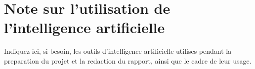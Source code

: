 \chapter*{Note sur l'utilisation de l'intelligence artificielle}

Indiquez ici, si besoin, les outils d'intelligence artificielle utilises pendant
la preparation du projet et la redaction du rapport, ainsi que le cadre de leur usage.
